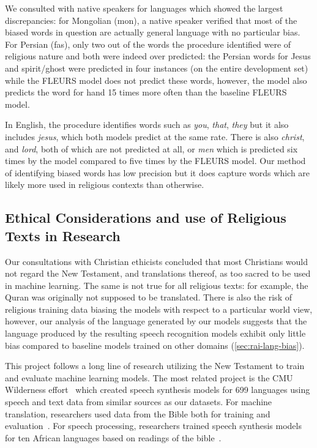 We consulted with native speakers for languages which showed the largest discrepancies:
for Mongolian (mon), a native speaker verified that most of the biased words in question are actually general language with no particular bias.
For Persian (fas), only two out of the words the procedure identified were of religious nature and both were indeed over predicted: the Persian words for Jesus and spirit/ghost were predicted in four instances (on the entire development set) while the FLEURS model does not predict these words, however, the \modelname{} model also predicts the word for hand 15 times more often than the baseline FLEURS model.



In English, the procedure identifies words such as \emph{you}, \emph{that}, \emph{they} but it also includes \emph{jesus}, which both models predict at the same rate. There is also \emph{christ}, and \emph{lord}, both of which are not predicted at all, or \emph{men} which is predicted six times by the \modelname{} model compared to five times by the FLEURS model.
Our method of identifying biased words has low precision but it does capture words which are likely more used in religious contexts than otherwise.


\insertDataRAIWords


\subsection{Ethical Considerations and use of Religious Texts in Research}
\label{sec:rai-ethical}

Our consultations with Christian ethicists concluded that most Christians would not regard the New Testament, and translations thereof, as too sacred to be used in machine learning.
The same is not true for all religious texts: for example, the Quran was originally not supposed to be  translated.
There is also the risk of religious training data biasing the models with respect to a particular world view, however, our analysis of the language generated by our models suggests that the language produced by the resulting speech recognition models exhibit only little bias compared to baseline models trained on other domains (\textsection\ref{sec:rai-lang-bias}).

This project follows a long line of research utilizing the New Testament to train and evaluate machine learning models.
The most related project is the CMU Wilderness effort~\citep{black2019cmu} which created speech synthesis models for 699 languages using speech and text data from similar sources as our datasets.
For machine translation, researchers used data from the Bible both for training and evaluation~\citep{christos2014bible,mccarthy2020bible,nllbteam2022language}.
For speech processing, researchers trained speech synthesis models for ten African languages based on readings of the bible~\citep{meyer2022bibletts}.
